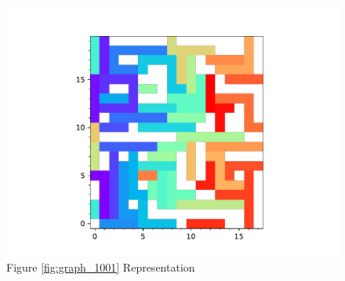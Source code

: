 \documentclass{standalone}
\begin{document}
\begin{figure}[!htb]
	\caption{Figure \ref{fig:graph_1001} Representation}
	\label{fig:picture_1001}
	\includegraphics[width=\textwidth]{../graphs/picture/1001.pdf}
\end{figure}
\end{document}
